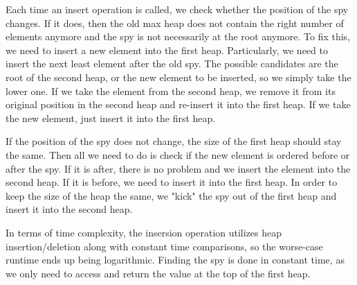 \documentclass{assignment-263}
\begin{document}
\smallbreak

Each time an insert operation is called, we check whether the position of the spy changes. If it does, then the old max heap does not contain the right number of elements anymore and the spy is not necessarily at the root anymore. To fix this, we need to insert a new element into the first heap. Particularly, we need to insert the next least element after the old spy. The possible candidates are the root of the second heap, or the new element to be inserted, so we simply take the lower one. If we take the element from the second heap, we remove it from its original position in the second heap and re-insert it into the first heap. If we take the new element, just insert it into the first heap.

\smallbreak

If the position of the spy does not change, the size of the first heap should stay the same. Then all we need to do is check if the new element is ordered before or after the spy. If it is after, there is no problem and we insert the element into the second heap. If it is before, we need to insert it into the first heap. In order to keep the size of the heap the same, we "kick" the spy out of the first heap and insert it into the second heap.

\smallbreak

In terms of time complexity, the insersion operation utilizes heap insertion/deletion along with constant time comparisons, so the worse-case runtime ends up being logarithmic. Finding the spy is done in constant time, as we only need to access and return the value at the top of the first heap.
\end{document}
